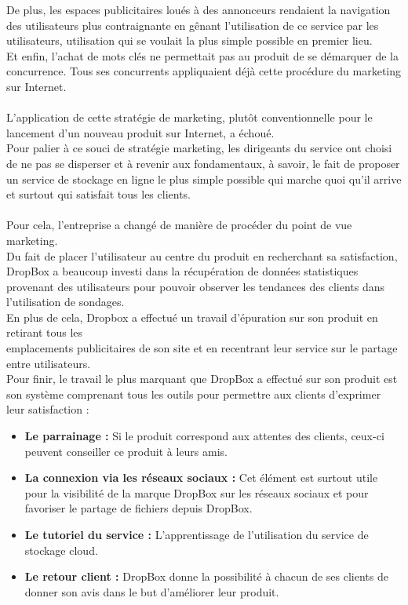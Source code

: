 \documentclass[a4paper, 10pt]{article}
\begin{document}
De plus, les espaces publicitaires loués à des annonceurs rendaient la navigation des utilisateurs plus contraignante en gênant
l'utilisation de ce service par les utilisateurs, utilisation qui se voulait la plus simple possible en premier lieu.\\
Et enfin, l'achat de mots clés ne permettait pas au produit de se démarquer de la concurrence.
Tous ses concurrents appliquaient déjà cette procédure du marketing sur Internet.\\ \\
L'application de cette stratégie de marketing, plutôt conventionnelle pour le lancement d'un nouveau produit sur Internet, a échoué.\\
Pour palier à ce souci de stratégie marketing, les dirigeants du service ont choisi de ne pas se disperser et à revenir aux fondamentaux,
à savoir, le fait de proposer un service de stockage en ligne le plus simple possible qui marche quoi qu'il arrive et
surtout qui satisfait tous les clients.\\ \\
Pour cela, l'entreprise a changé de manière de procéder du point de vue marketing.\\
Du fait de placer l'utilisateur au centre du produit en recherchant sa satisfaction,
DropBox a beaucoup investi dans la récupération de données statistiques provenant des utilisateurs pour pouvoir observer les tendances
des clients dans l'utilisation de sondages.\\
En plus de cela, Dropbox a effectué un travail d'épuration sur son produit en retirant tous les\\emplacements publicitaires de son site
et en recentrant leur service sur le partage entre utilisateurs.\\
Pour finir, le travail le plus marquant que DropBox a effectué sur son produit est son système comprenant tous les outils pour permettre
aux clients d'exprimer leur satisfaction :
\begin{itemize}
 \item \textbf{Le parrainage :} Si le produit correspond aux attentes des clients, ceux-ci peuvent conseiller ce produit à leurs amis.
 \item \textbf{La connexion via les réseaux sociaux :} Cet élément est surtout utile pour la visibilité de la marque DropBox sur les
réseaux sociaux et pour favoriser le partage de fichiers depuis DropBox.
 \item \textbf{Le tutoriel du service :} L'apprentissage de l'utilisation du service de stockage cloud.
 \item \textbf{Le retour client :} DropBox donne la possibilité à chacun de ses clients de donner son avis
dans le but d'améliorer leur produit.
\end{itemize}
\end{document}

